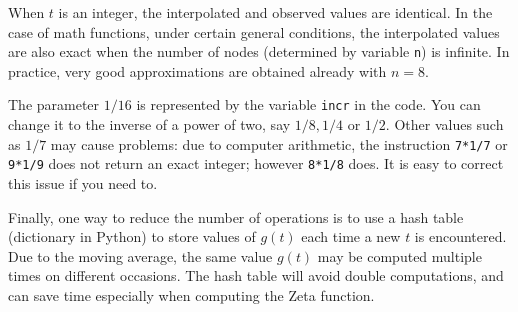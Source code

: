 \documentclass[oneside,10pt]{book}
\begin{document}
When $t$ is an integer, the interpolated and observed values are identical. In the case of math functions, under certain general conditions, the interpolated values are also exact when the number of nodes (determined by variable \texttt{n}) is infinite. In practice, very good approximations are obtained already with $n=8$.

The parameter $1/16$ is represented by the variable \texttt{incr} in the code. You can change it to the inverse of a power of two, say $1/8, 1/4$ or $1/2$. Other values
 such as $1/7$ may cause problems: due to computer arithmetic, the instruction \texttt{7*1/7} or \texttt{9*1/9} does not return an exact integer; however \texttt{8*1/8} does. It is 
 easy to  correct this issue if you need to. 

Finally, one way to reduce the number of operations is to use a hash table (dictionary in Python) to store values of $g(t)$ each time a new $t$ is encountered. Due to the moving average, the same value $g(t)$ may be computed multiple times on different occasions. The hash table will avoid double computations, and can save 
 time especially when computing the Zeta function. \vspace{1ex}
\end{document}
